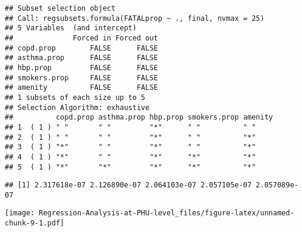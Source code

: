 \documentclass[]{article}
\newenvironment{Shaded}{\begin{snugshade}}{\end{snugshade}}
\newcommand{\CommentTok}[1]{\textcolor[rgb]{0.56,0.35,0.01}{\textit{#1}}}
\newcommand{\DataTypeTok}[1]{\textcolor[rgb]{0.13,0.29,0.53}{#1}}
\newcommand{\DecValTok}[1]{\textcolor[rgb]{0.00,0.00,0.81}{#1}}
\newcommand{\KeywordTok}[1]{\textcolor[rgb]{0.13,0.29,0.53}{\textbf{#1}}}
\newcommand{\NormalTok}[1]{#1}
\newcommand{\OperatorTok}[1]{\textcolor[rgb]{0.81,0.36,0.00}{\textbf{#1}}}
\newcommand{\OtherTok}[1]{\textcolor[rgb]{0.56,0.35,0.01}{#1}}
\newcommand{\StringTok}[1]{\textcolor[rgb]{0.31,0.60,0.02}{#1}}
\begin{document}
\begin{verbatim}
## Subset selection object
## Call: regsubsets.formula(FATALprop ~ ., final, nvmax = 25)
## 5 Variables  (and intercept)
##              Forced in Forced out
## copd.prop        FALSE      FALSE
## asthma.prop      FALSE      FALSE
## hbp.prop         FALSE      FALSE
## smokers.prop     FALSE      FALSE
## amenity          FALSE      FALSE
## 1 subsets of each size up to 5
## Selection Algorithm: exhaustive
##          copd.prop asthma.prop hbp.prop smokers.prop amenity
## 1  ( 1 ) " "       " "         "*"      " "          " "    
## 2  ( 1 ) " "       " "         "*"      " "          "*"    
## 3  ( 1 ) "*"       " "         "*"      " "          "*"    
## 4  ( 1 ) "*"       " "         "*"      "*"          "*"    
## 5  ( 1 ) "*"       "*"         "*"      "*"          "*"
\end{verbatim}

\begin{Shaded}
\end{Shaded}

\begin{verbatim}
## [1] 2.317618e-07 2.126890e-07 2.064103e-07 2.057105e-07 2.057089e-07
\end{verbatim}

\begin{Shaded}
\end{Shaded}

\texttt{[image: Regression-Analysis-at-PHU-level\_files/figure-latex/unnamed-chunk-9-1.pdf]}

\begin{Shaded}
\end{Shaded}
\end{document}
